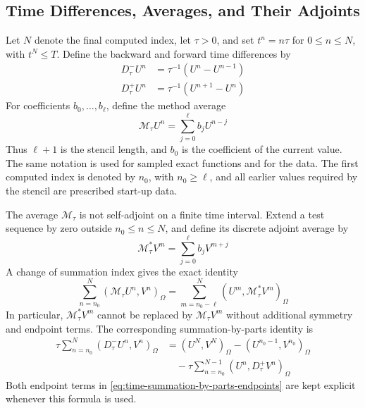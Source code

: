 \documentclass[11pt]{article}
\begin{document}

\subsection{Time Differences, Averages, and Their Adjoints}
\label{subsec:time-operators}
Let \(N\) denote the final computed index, let \(\tau>0\), and set
\(t^n=n\tau\) for \(0\le n\le N\), with \(t^N\le T\). Define the backward and
forward time differences by
\begin{align}
D_{\tau}^{-}U^n&=\tau^{-1}(U^n-U^{n-1}) \label{eq:backward-time-difference}\\
D_{\tau}^{+}U^n&=\tau^{-1}(U^{n+1}-U^n) \label{eq:forward-time-difference}
\end{align}
For coefficients \(b_0,\ldots,b_{\ell}\), define the method average
\begin{equation}
\mathcal M_{\tau}U^n=\sum_{j=0}^{\ell}b_jU^{n-j} \label{eq:method-average}
\end{equation}
Thus \(\ell+1\) is the stencil length, and \(b_0\) is the coefficient of the
current value.
The same notation is used for sampled exact functions and for the data. The
first computed index is denoted by \(n_0\), with \(n_0\ge\ell\), and all
earlier values required by the stencil are prescribed start-up data.

The average \(\mathcal M_{\tau}\) is not self-adjoint on a finite time
interval. Extend a test sequence by zero outside \(n_0\le n\le N\), and define
its discrete adjoint average by
\begin{equation}
\mathcal M_{\tau}^{*}V^m=\sum_{j=0}^{\ell}b_jV^{m+j} \label{eq:adjoint-method-average}
\end{equation}
A change of summation index gives the exact identity
\begin{equation}
\sum_{n=n_0}^{N}(\mathcal M_{\tau}U^n,V^n)_{\Omega}
=\sum_{m=n_0-\ell}^{N}(U^m,\mathcal M_{\tau}^{*}V^m)_{\Omega} \label{eq:average-adjoint-identity}
\end{equation}
In particular, \(\mathcal M_{\tau}^{*}V^m\) cannot be replaced by
\(\mathcal M_{\tau}V^m\) without additional symmetry and endpoint terms.
The corresponding summation-by-parts identity is
\begin{align}
\tau\sum_{n=n_0}^{N}(D_{\tau}^{-}U^n,V^n)_{\Omega}
&=(U^N,V^N)_{\Omega}-(U^{n_0-1},V^{n_0})_{\Omega} \label{eq:time-summation-by-parts-endpoints}\\
&\quad-\tau\sum_{n=n_0}^{N-1}(U^n,D_{\tau}^{+}V^n)_{\Omega} \label{eq:time-summation-by-parts-bulk}
\end{align}
Both endpoint terms in \eqref{eq:time-summation-by-parts-endpoints} are kept
explicit whenever this formula is used.
\end{document}

